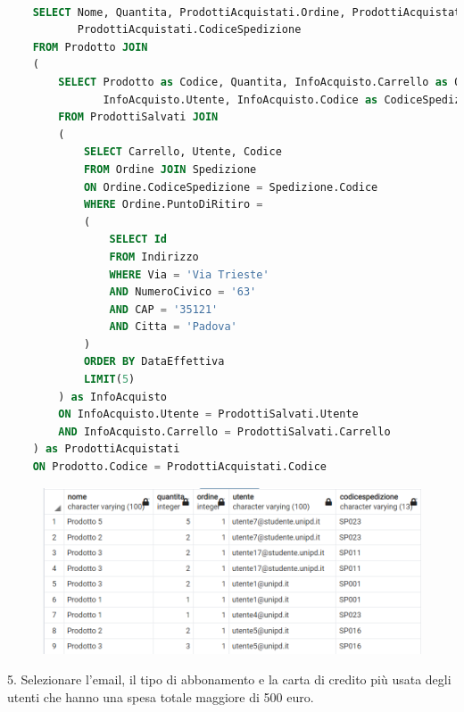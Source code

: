 \documentclass[10pt]{article}
\begin{document}
\begin{lstlisting}[language=SQL]

    SELECT Nome, Quantita, ProdottiAcquistati.Ordine, ProdottiAcquistati.Utente,
           ProdottiAcquistati.CodiceSpedizione
    FROM Prodotto JOIN
    (
        SELECT Prodotto as Codice, Quantita, InfoAcquisto.Carrello as Ordine,
               InfoAcquisto.Utente, InfoAcquisto.Codice as CodiceSpedizione
        FROM ProdottiSalvati JOIN 
        (
            SELECT Carrello, Utente, Codice
            FROM Ordine JOIN Spedizione
            ON Ordine.CodiceSpedizione = Spedizione.Codice
            WHERE Ordine.PuntoDiRitiro = 
            (
                SELECT Id 
                FROM Indirizzo
                WHERE Via = 'Via Trieste'
                AND NumeroCivico = '63'
                AND CAP = '35121'
                AND Citta = 'Padova'
            )
            ORDER BY DataEffettiva
            LIMIT(5)
        ) as InfoAcquisto
        ON InfoAcquisto.Utente = ProdottiSalvati.Utente
        AND InfoAcquisto.Carrello = ProdottiSalvati.Carrello
    ) as ProdottiAcquistati
    ON Prodotto.Codice = ProdottiAcquistati.Codice
\end{lstlisting}

\begin{center}
    \begin{figure}[H]
        \includegraphics[scale=1]{media/query4.png}
        \label{query4}
    \end{figure}
\end{center}
5. Selezionare l'email, il tipo di abbonamento e la carta di credito più usata
degli utenti che hanno una spesa totale maggiore di 500 euro.
\end{document}
